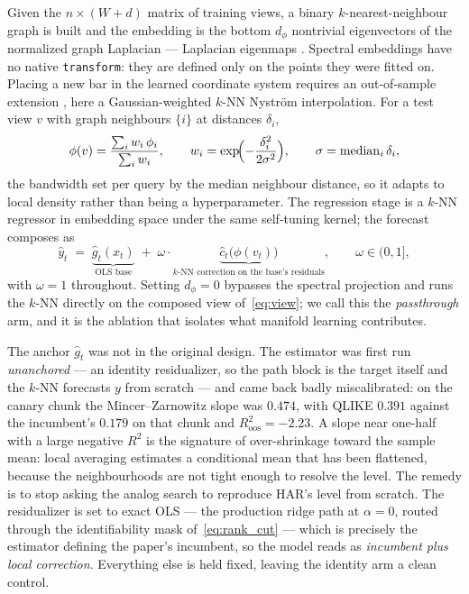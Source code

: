 Given the $n \times (W+d)$ matrix of training views, a binary $k$-nearest-neighbour
graph is built and the embedding is the bottom $d_\phi$ nontrivial eigenvectors of
the normalized graph Laplacian --- Laplacian eigenmaps \citep{BelkinNiyogi2003}.
Spectral embeddings have no native \texttt{transform}: they are defined only on
the points they were fitted on. Placing a new bar in the learned coordinate system
requires an out-of-sample extension \citep{Bengio2004}, here a Gaussian-weighted
$k$-NN Nystr\"om interpolation. For a test view $v$ with graph neighbours $\{i\}$
at distances $\delta_i$,
\begin{equation}
\phi(v) = \frac{\sum_i w_i \, \phi_i}{\sum_i w_i},
\qquad
w_i = \exp\!\Bigl(-\frac{\delta_i^2}{2\sigma^2}\Bigr),
\qquad
\sigma = \operatorname{median}_i \delta_i,
\label{eq:nystrom}
\end{equation}
the bandwidth set per query by the median neighbour distance, so it adapts to local
density rather than being a hyperparameter. The regression stage is a $k$-NN
regressor in embedding space under the same self-tuning kernel; the forecast
composes as
\begin{equation}
\hat{y}_t \;=\; \underbrace{\hat{g}_t(x_t)}_{\text{OLS base}}
\;+\; \omega \cdot \underbrace{\hat{c}_t\bigl(\phi(v_t)\bigr)}_{\text{$k$-NN correction on the base's residuals}},
\qquad \omega \in (0,1],
\label{eq:spectral_pred}
\end{equation}
with $\omega = 1$ throughout. Setting $d_\phi = 0$ bypasses the spectral projection
and runs the $k$-NN directly on the composed view of~\eqref{eq:view}; we call this
the \emph{passthrough} arm, and it is the ablation that isolates what manifold
learning contributes.

The anchor $\hat{g}_t$ was not in the original design. The estimator was first run
\emph{unanchored} --- an identity residualizer, so the path block is the target
itself and the $k$-NN forecasts $y$ from scratch --- and came back badly
miscalibrated: on the canary chunk the Mincer--Zarnowitz slope was $0.474$, with
QLIKE $0.391$ against the incumbent's $0.179$ on that chunk and
$R^2_{\mathrm{oos}} = -2.23$. A slope near one-half with a large negative $R^2$ is
the signature of over-shrinkage toward the sample mean: local averaging estimates a
conditional mean that has been flattened, because the neighbourhoods are not tight
enough to resolve the level. The remedy is to stop asking the analog search to
reproduce HAR's level from scratch. The residualizer is set to exact OLS --- the
production ridge path at $\alpha = 0$, routed through the identifiability mask
of~\eqref{eq:rank_cut} --- which is precisely the estimator defining the paper's
incumbent, so the model reads as \emph{incumbent plus local correction}. Everything
else is held fixed, leaving the identity arm a clean control.


